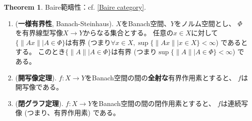 \documentclass[uplatex]{jsarticle}
\theoremstyle{definition}
\newtheorem{thm}{Theorem}[section]
\begin{document}
\begin{thm}\label{Banach prop}
  Baire範疇性：cf. \autoref{Baire category}.
  \begin{enumerate}
    \item \label{B-S}
    (\textbf{一様有界性}, Banach-Steinhaus).
    \(X\)をBanach空間、\(Y\)をノルム空間とし、
    \(\Phi\)を有界線型写像\(X\to Y\)からなる集合とする。
    任意の\(x\in X\)に対して\(\{\|Ax\| | A\in \Phi\}\)は有界
    (つまり\(\forall x\in X, \sup\{\|Ax\||x\in X\}<\infty\)) であるとする。
    このとき\(\{\|A\| | A\in \Phi\}\)は有界
    (つまり\(\sup\{\|A\| | A\in\Phi\} < \infty\))
    である。
    \item \label{B-op}
    (\textbf{開写像定理}).
    \(f:X\to Y\)をBanach空間の間の\textbf{全射な}有界作用素とすると、
    \(f\)は開写像である。
    \item \label{B-cl}
    (\textbf{閉グラフ定理}).
    \(f:X\to Y\)をBanach空間の間の閉作用素とすると、
    \(f\)は連続写像 (つまり、有界作用素) である。
  \end{enumerate}
\end{thm}
\end{document}
